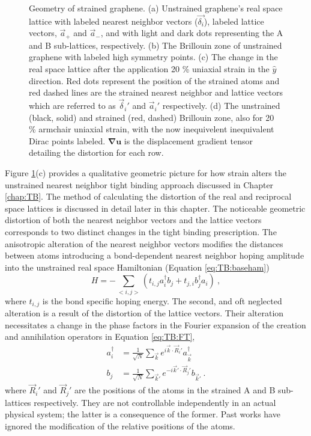 \begin{figure}
  
  \caption[Geometry of strained graphene]{\label{fig:PVP:lattice} Geometry of strained graphene.  (a) Unstrained graphene's real space lattice with labeled nearest neighbor vectors ($\vec{\delta_i}$), labeled lattice vectors, $\vec{a}_+$ and  $\vec{a}_-$, and with light and dark dots representing the A and B sub-lattices, respectively. (b) The Brillouin zone of unstrained graphene with labeled high symmetry points. (c) The change in the real space lattice after the application 20 \% uniaxial strain in the $\hat{y}$ direction.  Red dots represent the position of the strained atoms and red dashed lines are the strained nearest neighbor and lattice vectors which are referred to as $\vec{\delta}_i'$ and $\vec{a}_i'$ respectively.  (d) The unstrained (black, solid) and strained (red, dashed) Brillouin zone, also for 20 \% armchair uniaxial strain, with the now inequivelent inequivalent Dirac points labeled.  $\bm{\nabla u}$ is the displacement gradient tensor detailing the distortion for each row.}
\end{figure}

Figure \ref{fig:PVP:lattice}(c) provides a qualitative geometric picture for how strain alters the unstrained nearest neighbor tight binding approach discussed in Chapter \ref{chap:TB}.
The method of calculating the distortion of the real and reciprocal space lattices is discussed in detail later in this chapter.
The noticeable geometric distortion of both the nearest neighbor vectors and the lattice vectors corresponds to two distinct changes in the tight binding prescription.
The anisotropic alteration of the nearest neighbor vectors modifies the distances between atoms introducing a bond-dependent nearest neighbor hoping amplitude into the unstrained real space Hamiltonian (Equation \ref{eq:TB:baseham}) \cite{Hasegawa2006}
\begin{equation}
  H=-\sum_{<i,j>} \left( t_{i,j} a_i^{\dagger} b_j + t_{j,i} b_j^{\dagger} a_i \right) \ ,
  \label{eq:PVP:RealSpace}
\end{equation}
where $t_{i,j}$ is the bond specific hoping energy.
The second, and oft neglected alteration is a result of the distortion of the lattice vectors.
Their alteration necessitates a change in the phase factors in the Fourier expansion of the creation and annihilation operators in Equation \ref{eq:TB:FT},
\begin{align}
  a_i^{\dagger}&=\frac{1}{\sqrt{N}}\sum_{\vec{k} } e^{ i \vec{k}  \cdot \vec{R}_i'} a_{\vec{k} }^{\dagger} \nonumber \\
  b_j          &=\frac{1}{\sqrt{N}}\sum_{\vec{k}'} e^{-i \vec{k}' \cdot \vec{R}_j'} b_{\vec{k}'} \ . \label{eq:PVP:FT} 
\end{align}
where $\vec{R}_i'$ and $\vec{R}_j'$ are the positions of the atoms in the strained A and B sub-lattices respectively.
They are not controllable independently in an actual physical system; the latter is a consequence of the former.
Past works have ignored the modification of the relative positions of the atoms.

